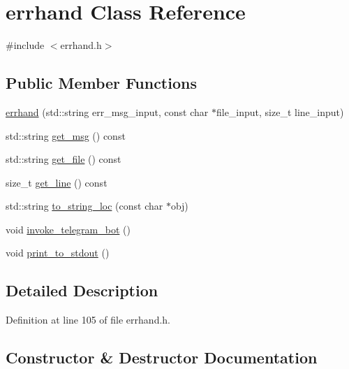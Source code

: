 \hypertarget{classerrhand}{}\section{errhand Class Reference}
\label{classerrhand}


{\ttfamily \#include $<$errhand.\+h$>$}

\subsection*{Public Member Functions}
\begin{DoxyCompactItemize}
\item 
\mbox{\hyperlink{classerrhand_a69afd61e0ebf5ee9d35f297dc2d5c086}{errhand}} (std\+::string err\+\_\+msg\+\_\+input, const char $\ast$file\+\_\+input, size\+\_\+t line\+\_\+input)
\item 
std\+::string \mbox{\hyperlink{classerrhand_a524dfc6821f703329d8801dd3298f33f}{get\+\_\+msg}} () const
\item 
std\+::string \mbox{\hyperlink{classerrhand_a1556ee8d0aaefeea3bbab73f7ae50914}{get\+\_\+file}} () const
\item 
size\+\_\+t \mbox{\hyperlink{classerrhand_a258f97d84476b21efc38827cda3e5889}{get\+\_\+line}} () const
\item 
std\+::string \mbox{\hyperlink{classerrhand_a930df1c197154853159683cb2ad55369}{to\+\_\+string\+\_\+loc}} (const char $\ast$obj)
\item 
void \mbox{\hyperlink{classerrhand_adbc86e81b391a68d2bf9a13529c977d3}{invoke\+\_\+telegram\+\_\+bot}} ()
\item 
void \mbox{\hyperlink{classerrhand_a5b4d8a74f1d0c6842526dc8b54e38dc2}{print\+\_\+to\+\_\+stdout}} ()
\end{DoxyCompactItemize}


\subsection{Detailed Description}


Definition at line 105 of file errhand.\+h.



\subsection{Constructor \& Destructor Documentation}
\mbox{\label{classerrhand_a69afd61e0ebf5ee9d35f297dc2d5c086}} 
